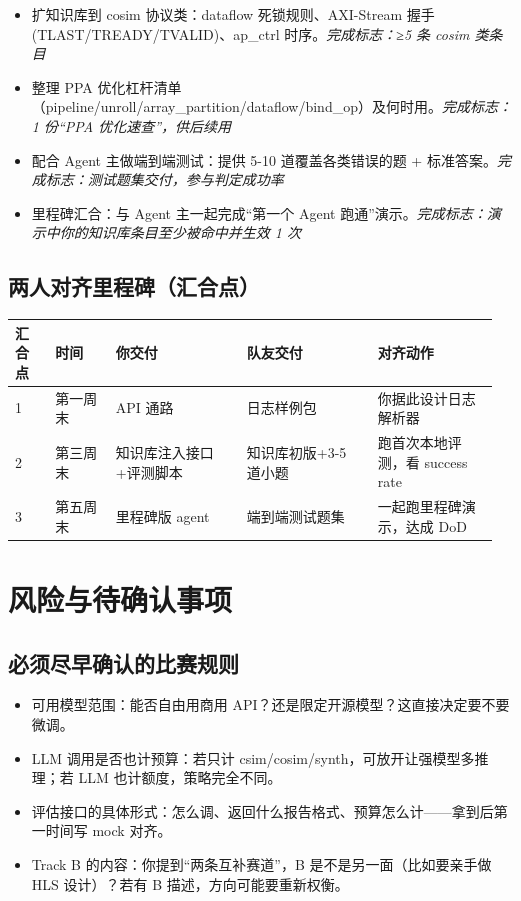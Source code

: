 \documentclass[12pt,a4paper]{ctexbook}
\begin{document}
\begin{itemize}
\item[☐] 扩知识库到 cosim 协议类：dataflow 死锁规则、AXI-Stream 握手(TLAST/TREADY/TVALID)、ap\_ctrl 时序。\hfill {\small\textit{完成标志：≥5 条 cosim 类条目}}
\item[☐] 整理 PPA 优化杠杆清单（pipeline/unroll/array\_partition/dataflow/bind\_op）及何时用。\hfill {\small\textit{完成标志：1 份“PPA 优化速查”，供后续用}}
\item[☐] 配合 Agent 主做端到端测试：提供 5-10 道覆盖各类错误的题 + 标准答案。\hfill {\small\textit{完成标志：测试题集交付，参与判定成功率}}
\item[☐] 里程碑汇合：与 Agent 主一起完成“第一个 Agent 跑通”演示。\hfill {\small\textit{完成标志：演示中你的知识库条目至少被命中并生效 1 次}}
\end{itemize}

\section{两人对齐里程碑（汇合点）}

\begin{longtable}{@{}p{0.08\linewidth}p{0.12\linewidth}p{0.26\linewidth}p{0.26\linewidth}p{0.24\linewidth}@{}}
\toprule
\textbf{汇合点} & \textbf{时间} & \textbf{你交付} & \textbf{队友交付} & \textbf{对齐动作} \\
\midrule
\endhead
1 & 第一周末 & API 通路 & 日志样例包 & 你据此设计日志解析器 \\
2 & 第三周末 & 知识库注入接口+评测脚本 & 知识库初版+3-5 道小题 & 跑首次本地评测，看 success rate \\
3 & 第五周末 & 里程碑版 agent & 端到端测试题集 & 一起跑里程碑演示，达成 DoD \\
\bottomrule
\end{longtable}

\chapter{风险与待确认事项}

\section{必须尽早确认的比赛规则}

\begin{itemize}
\item 可用模型范围：能否自由用商用 API？还是限定开源模型？这直接决定要不要微调。
\item LLM 调用是否也计预算：若只计 csim/cosim/synth，可放开让强模型多推理；若 LLM 也计额度，策略完全不同。
\item 评估接口的具体形式：怎么调、返回什么报告格式、预算怎么计——拿到后第一时间写 mock 对齐。
\item Track B 的内容：你提到“两条互补赛道”，B 是不是另一面（比如要亲手做 HLS 设计）？若有 B 描述，方向可能要重新权衡。
\end{itemize}
\end{document}
